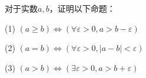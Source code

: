 \begin{prob}[分析学基本原理]
对于实数$a,b$，证明以下命题：

(1) $(a\geq b)\Leftrightarrow(\forall\varepsilon>0,a>b-\varepsilon)$

(2) $(a=b)\Leftrightarrow(\forall\varepsilon>0,|a-b|<\varepsilon)$

(3) $(a>b)\Leftrightarrow(\exists\varepsilon>0,a>b+\varepsilon)$

\end{prob}\vs







